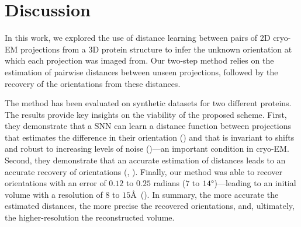 \section{Discussion}\label{sec:discussion}

In this work, we explored the use of distance learning between pairs of 2D cryo-EM projections from a 3D protein structure to infer the unknown orientation at which each projection was imaged from.
Our two-step method relies on the estimation of pairwise distances between unseen projections, followed by the recovery of the orientations from these distances.


The method has been evaluated on synthetic datasets for two different proteins.
The results provide key insights on the viability of the proposed scheme.
First, they demonstrate that a SNN can learn a distance function between projections that estimates the difference in their orientation () and that is invariant to shifts and robust to increasing levels of noise ()---an important condition in cryo-EM\@.
Second, they demonstrate that an accurate estimation of distances leads to an accurate recovery of orientations (, ).
Finally, our method was able to recover orientations with an error of $0.12$ to $0.25$ radians ($7$ to $14\degree$)---leading to an initial volume
with a resolution of $8$ to $15$\AA\ ().
In summary, the more accurate the estimated distances, the more precise the recovered orientations, and, ultimately, the higher-resolution the reconstructed volume.

